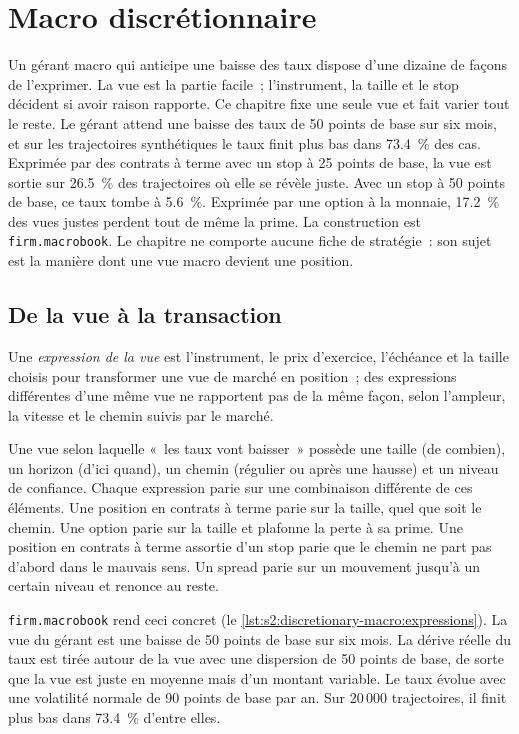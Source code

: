 \chapter{Macro discrétionnaire}\label{ch:s2:discretionary-macro}

Un gérant macro qui anticipe une baisse des taux dispose d'une dizaine de façons de l'exprimer. La vue est la partie facile~; l'instrument, la taille et le stop
décident si avoir raison rapporte. Ce chapitre fixe une seule vue et fait varier tout le reste. Le gérant attend une baisse des taux de 50 points de base
sur six mois, et sur les trajectoires synthétiques le taux finit plus bas dans 73.4~\% des cas. Exprimée par des contrats à terme avec un stop à 25 points de base, la
vue est sortie sur 26.5~\% des trajectoires où elle se révèle juste. Avec un stop à 50 points de base, ce taux tombe à 5.6~\%. Exprimée par une option à la
monnaie, 17.2~\% des vues justes perdent tout de même la prime. La construction est \texttt{firm.macrobook}. Le chapitre ne comporte aucune fiche de stratégie~: son
sujet est la manière dont une vue macro devient une position.

\section{De la vue à la transaction}

\begin{definition}\label{def:s2:discretionary-macro:expression}
Une \emph{expression de la vue} est l'instrument, le prix d'exercice, l'échéance et la taille choisis pour transformer une vue de marché en position~; des expressions différentes d'une même vue ne rapportent pas de la même façon,
selon l'ampleur, la vitesse et le chemin suivis par le marché.
\end{definition}

Une vue selon laquelle «~les taux vont baisser~» possède une taille (de combien), un horizon (d'ici quand), un chemin (régulier ou après une hausse) et un niveau de confiance. Chaque expression
parie sur une combinaison différente de ces éléments. Une position en contrats à terme parie sur la taille, quel que soit le chemin. Une option parie sur la taille et plafonne la perte à sa prime. Une
position en contrats à terme assortie d'un stop parie que le chemin ne part pas d'abord dans le mauvais sens. Un spread parie sur un mouvement jusqu'à un certain niveau et renonce au reste.

\texttt{firm.macrobook} rend ceci concret (le \cref{lst:s2:discretionary-macro:expressions}). La vue du gérant est une baisse de 50 points de base sur six
mois. La dérive réelle du taux est tirée autour de la vue avec une dispersion de 50 points de base, de sorte que la vue est juste en moyenne mais d'un montant variable.
Le taux évolue avec une volatilité normale de 90 points de base par an. Sur 20\,000 trajectoires, il finit plus bas dans 73.4~\% d'entre elles.

